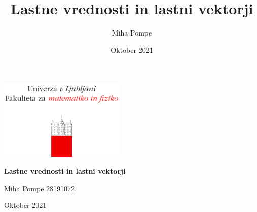 \documentclass[12pt, a4paper]{article}
\title{Lastne vrednosti in lastni vektorji}
\author{Miha Pompe}
\date{Oktober 2021}
\begin{document}
\begin{titlepage}
	\centering
 	\includegraphics[width=0.45\textwidth]{logo_fmf_uni-lj_sl_veliki.png}\par\vspace{1cm}

	\vspace{1cm}

	\vspace{1.5cm}
	{\huge\bfseries Lastne vrednosti in lastni vektorji\par}
	\vspace{2cm}
	{\Large Miha Pompe 28191072\par}
	\vfill

	\vfill

	{\large Oktober 2021\par}
\end{titlepage}
\thispagestyle{empty}
\clearpage
{}
\newpage
\end{document}
